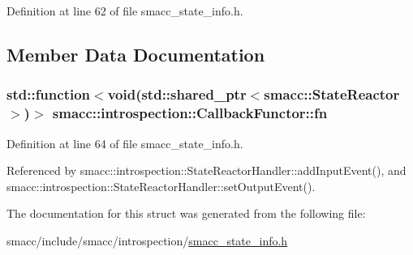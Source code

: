Definition at line 62 of file smacc\+\_\+state\+\_\+info.\+h.



\subsection{Member Data Documentation}
\subsubsection[{\texorpdfstring{fn}{fn}}]{\setlength{\rightskip}{0pt plus 5cm}std\+::function$<$void(std\+::shared\+\_\+ptr$<${\bf smacc\+::\+State\+Reactor}$>$)$>$ smacc\+::introspection\+::\+Callback\+Functor\+::fn}\hypertarget{structsmacc_1_1introspection_1_1CallbackFunctor_a459e9ea2fb050739b927c4722c843e51}{}\label{structsmacc_1_1introspection_1_1CallbackFunctor_a459e9ea2fb050739b927c4722c843e51}


Definition at line 64 of file smacc\+\_\+state\+\_\+info.\+h.



Referenced by smacc\+::introspection\+::\+State\+Reactor\+Handler\+::add\+Input\+Event(), and smacc\+::introspection\+::\+State\+Reactor\+Handler\+::set\+Output\+Event().



The documentation for this struct was generated from the following file\+:\begin{DoxyCompactItemize}
\item 
smacc/include/smacc/introspection/\hyperlink{smacc__state__info_8h}{smacc\+\_\+state\+\_\+info.\+h}\end{DoxyCompactItemize}
